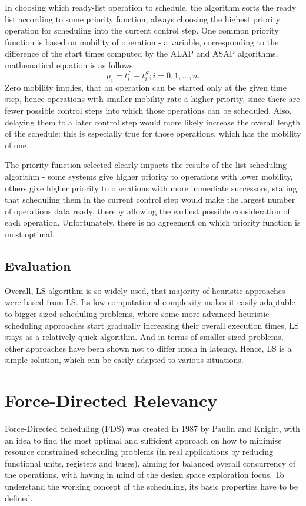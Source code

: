 \documentclass[conference]{IEEEtran}
\begin{document}
In choosing which ready-list operation to schedule, the algorithm sorts the ready list according to some priority function, always choosing the highest priority operation for scheduling into the current control step. One common priority function is based on mobility of operation - a variable, corresponding to the difference of the start times computed by the ALAP and ASAP algorithms, 
mathematical equation is as follows: 
\begin{equation*}
\displaystyle \mu_i = t_i^L - t_i^S; i = 0, 1, ..., n.
\end{equation*}
Zero mobility implies, that an operation can be started only at the given time step, hence operations with smaller mobility rate a higher priority, since there are fewer possible control steps into which those operations can be scheduled. Also, delaying them to a later control step would more likely increase the overall length of the schedule: this is especially true for those operations, which has the mobility of one.

The priority function selected clearly impacts the results of the list-scheduling algorithm - some systems give higher priority to operations with lower mobility, others give higher priority to operations with more immediate successors, stating that scheduling them in the current control step would make the largest number of operations data ready, thereby allowing the earliest possible consideration of each operation. Unfortunately, there is no agreement on which priority function is most optimal.

\subsection{Evaluation}

Overall, LS algorithm is so widely used, that majority of heuristic approaches were based from LS. Its low computational complexity makes it easily adaptable to bigger sized scheduling problems, where some more advanced heuristic scheduling approaches start gradually increasing their overall execution times, LS stays as a relatively quick algorithm. And in terms of smaller sized problems, other approaches have been shown not to differ much in latency. Hence, LS is a simple solution, which can be easily adapted to various situations.

\section{Force-Directed Relevancy}
Force-Directed Scheduling (FDS) was created in 1987 by Paulin and Knight, with an idea to find the most optimal and sufficient approach on how to minimise resource constrained scheduling problems (in real applications by reducing functional units, registers and buses), aiming for balanced overall concurrency of the operations, with having in mind of the design space exploration focus. To understand the working concept of the scheduling, its basic properties have to be defined.
\end{document}
